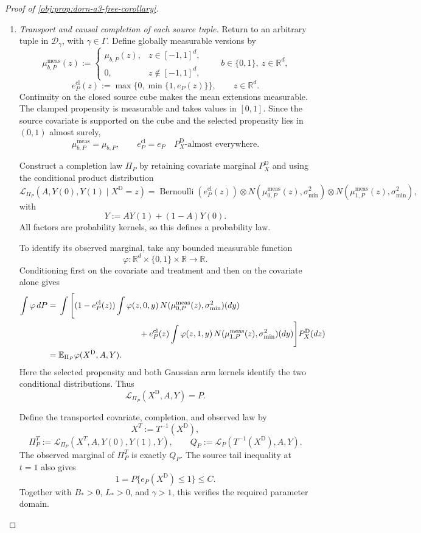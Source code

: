 \begin{proof}[Proof of \cref{obj:prop:dorn-a3-free-corollary}]
\begin{enumerate}
\item \emph{Transport and causal completion of each source tuple.}
Return to an arbitrary tuple in \(\mathcal D_\gamma\), with \(\gamma\in\Gamma\). Define globally measurable versions by
\[
\mu_{b,P}^{\mathrm{meas}}(z):=
\begin{cases}
\mu_{b,P}(z),&z\in[-1,1]^d,\\
0,&z\notin[-1,1]^d,
\end{cases}
\qquad
b\in\{0,1\},\ z\in\mathbb R^d,
\]
\[
e_P^{\mathrm{cl}}(z):=
\max\{0,\min\{1,e_P(z)\}\},
\qquad z\in\mathbb R^d.
\]
Continuity on the closed source cube makes the mean extensions measurable. The clamped propensity is measurable and takes values in \([0,1]\). Since the source covariate is supported on the cube and the selected propensity lies in \((0,1)\) almost surely,
\[
\mu_{b,P}^{\mathrm{meas}}=\mu_{b,P},
\qquad
e_P^{\mathrm{cl}}=e_P
\quad P_X^{\mathrm D}\text{-almost everywhere}.
\]

Construct a completion law \(\Pi_P\) by retaining covariate marginal
\(P_X^{\mathrm D}\) and using the conditional product distribution
\[
\mathcal L_{\Pi_P}(A,Y(0),Y(1)\mid X^{\mathrm D}=z)
=
\operatorname{Bernoulli}(e_P^{\mathrm{cl}}(z))
\otimes
N(\mu_{0,P}^{\mathrm{meas}}(z),\sigma_{\min}^2)
\otimes
N(\mu_{1,P}^{\mathrm{meas}}(z),\sigma_{\min}^2),
\]
with
\[
Y:=AY(1)+(1-A)Y(0).
\]
All factors are probability kernels, so this defines a probability law.

To identify its observed marginal, take any bounded measurable function
\[
\varphi:\mathbb R^d\times\{0,1\}\times\mathbb R\longrightarrow\mathbb R.
\]
Conditioning first on the covariate and treatment and then on the covariate alone gives
\[
\begin{aligned}
\int \varphi\,dP
={}&
\int\Bigg[
(1-e_P^{\mathrm{cl}}(z))
\int\varphi(z,0,y)\,
N(\mu_{0,P}^{\mathrm{meas}}(z),\sigma_{\min}^2)(dy)
\\
&\hspace{34mm}
+
e_P^{\mathrm{cl}}(z)
\int\varphi(z,1,y)\,
N(\mu_{1,P}^{\mathrm{meas}}(z),\sigma_{\min}^2)(dy)
\Bigg]P_X^{\mathrm D}(dz)
\\
={}&
\mathbb E_{\Pi_P}\varphi(X^{\mathrm D},A,Y).
\end{aligned}
\]
Here the selected propensity and both Gaussian arm kernels identify the two conditional distributions. Thus
\[
\mathcal L_{\Pi_P}(X^{\mathrm D},A,Y)=P.
\]

Define the transported covariate, completion, and observed law by
\[
X^T:=T^{-1}(X^{\mathrm D}),
\]
\[
\Pi_P^T:=
\mathcal L_{\Pi_P}(X^T,A,Y(0),Y(1),Y),
\qquad
Q_P:=
\mathcal L_P(T^{-1}(X^{\mathrm D}),A,Y).
\]
The observed marginal of \(\Pi_P^T\) is exactly \(Q_P\). The source tail inequality at \(t=1\) also gives
\[
1=P\{e_P(X^{\mathrm D})\le1\}\le C.
\]
Together with \(B_*>0\), \(L_*>0\), and \(\gamma>1\), this verifies the required parameter domain.


\end{enumerate}
\end{proof}
